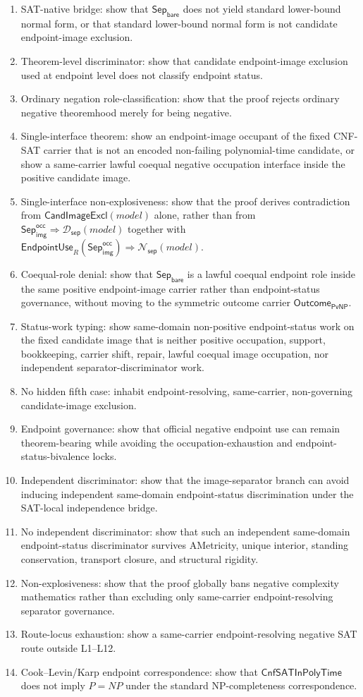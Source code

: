 \documentclass[11pt]{article}
\theoremstyle{definition}
\theoremstyle{remark}
\newcommand{\SepBare}{\mathsf{Sep}_{\mathsf{bare}}}
\newcommand{\SepImgOcc}{\mathsf{Sep}_{\mathsf{img}}^{\mathsf{occ}}}
\newcommand{\CnfSATP}{\mathsf{CnfSATInPolyTime}}
\newcommand{\EndpointUse}{\mathsf{EndpointUse}}
\newcommand{\SepDisc}{\mathcal{D}_{\mathsf{sep}}}
\newcommand{\NoSepDisc}{\mathcal{N}_{\mathsf{sep}}}
\newcommand{\CandImageExcl}{\mathsf{CandImageExcl}}
\newcommand{\OutcomePvNP}{\mathsf{Outcome}_{\mathsf{PvNP}}}
\begin{document}
\begin{enumerate}
\item SAT-native bridge: show that \(\SepBare\) does not yield standard lower-bound normal form, or that standard lower-bound normal form is not candidate endpoint-image exclusion.
\item Theorem-level discriminator: show that candidate endpoint-image exclusion used at endpoint level does not classify endpoint status.
\item Ordinary negation role-classification: show that the proof rejects ordinary negative theoremhood merely for being negative.
\item Single-interface theorem: show an endpoint-image occupant of the fixed CNF-SAT carrier that is not an encoded non-failing polynomial-time candidate, or show a same-carrier lawful coequal negative occupation interface inside the positive candidate image.
\item Single-interface non-explosiveness: show that the proof derives contradiction from \(\CandImageExcl(model)\) alone, rather than from \(\SepImgOcc\Rightarrow\SepDisc(model)\) together with \(\EndpointUse_R(\SepImgOcc)\Rightarrow\NoSepDisc(model)\).
\item Coequal-role denial: show that \(\SepBare\) is a lawful coequal endpoint role inside the same positive endpoint-image carrier rather than endpoint-status governance, without moving to the symmetric outcome carrier \(\OutcomePvNP\).
\item Status-work typing: show same-domain non-positive endpoint-status work on the fixed candidate image that is neither positive occupation, support, bookkeeping, carrier shift, repair, lawful coequal image occupation, nor independent separator-discriminator work.
\item No hidden fifth case: inhabit endpoint-resolving, same-carrier, non-governing candidate-image exclusion.
\item Endpoint governance: show that official negative endpoint use can remain theorem-bearing while avoiding the occupation-exhaustion and endpoint-status-bivalence locks.
\item Independent discriminator: show that the image-separator branch can avoid inducing independent same-domain endpoint-status discrimination under the SAT-local independence bridge.
\item No independent discriminator: show that such an independent same-domain endpoint-status discriminator survives AMetricity, unique interior, standing conservation, transport closure, and structural rigidity.
\item Non-explosiveness: show that the proof globally bans negative complexity mathematics rather than excluding only same-carrier endpoint-resolving separator governance.
\item Route-locus exhaustion: show a same-carrier endpoint-resolving negative SAT route outside L1--L12.
\item Cook--Levin/Karp endpoint correspondence: show that \(\CnfSATP\) does not imply \(P=NP\) under the standard NP-completeness correspondence.
\end{enumerate}
\end{document}
